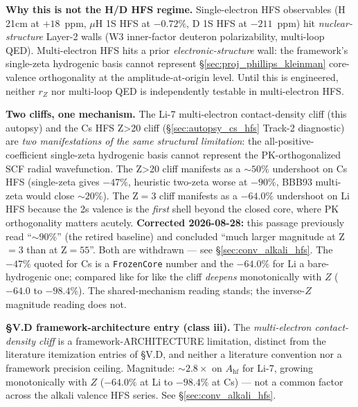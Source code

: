 \documentclass[11pt]{article}
\begin{document}
\textbf{Why this is not the H/D HFS regime.}  Single-electron HFS
observables (H 21cm at $+18$~ppm, $\mu$H 1S HFS at $-0.72\%$, D 1S HFS at
$-211$~ppm) hit \emph{nuclear-structure} Layer-2 walls (W3 inner-factor
deuteron polarizability, multi-loop QED).  Multi-electron HFS hits a
prior \emph{electronic-structure} wall: the framework's
single-zeta hydrogenic basis cannot represent
\S\ref{sec:proj_phillips_kleinman} core-valence orthogonality at the
amplitude-at-origin level.  Until this is engineered, neither $r_Z$
nor multi-loop QED is independently testable in multi-electron HFS.

\textbf{Two cliffs, one mechanism.}  The Li-7 multi-electron
contact-density cliff (this autopsy) and the Cs HFS Z\textgreater 20 cliff
(\S\ref{sec:autopsy_cs_hfs} Track-2 diagnostic) are \emph{two manifestations
of the same structural limitation}: the all-positive-coefficient
single-zeta hydrogenic basis cannot represent the PK-orthogonalized SCF
radial wavefunction.  The Z\textgreater 20 cliff manifests as a
$\sim 50\%$ undershoot on Cs HFS (single-zeta gives $-47\%$, heuristic
two-zeta worse at $-90\%$, BBB93 multi-zeta would close $\sim 20\%$).
The Z$=3$ cliff manifests as a $-64.0\%$ undershoot on Li HFS because
the 2s valence is the \emph{first} shell beyond the closed core, where
PK orthogonality matters acutely.  \textbf{Corrected 2026-08-28:} this
passage previously read ``$\sim 90\%$'' (the retired baseline) and
concluded ``much larger magnitude at Z$=3$ than at Z$=55$''.  Both are
withdrawn --- see \S\ref{sec:conv_alkali_hfs}.  The $-47\%$ quoted for Cs
is a \texttt{FrozenCore} number and the $-64.0\%$ for Li a bare-hydrogenic
one; compared like for like the cliff \emph{deepens} monotonically with
$Z$ ($-64.0$ to $-98.4\%$).  The shared-mechanism reading stands; the
inverse-$Z$ magnitude reading does not.


\textbf{§V.D framework-architecture entry (class iii).}  The
\emph{multi-electron contact-density cliff} is a framework-ARCHITECTURE
limitation, distinct from the literature itemization entries of §V.D,
and neither a literature convention nor a framework precision ceiling.  Magnitude:
$\sim 2.8\times$ on $A_\text{hf}$ for Li-7, growing monotonically with
$Z$ ($-64.0\%$ at Li to $-98.4\%$ at Cs) --- not a common factor
across the alkali valence HFS series.  See \S\ref{sec:conv_alkali_hfs}.
\end{document}
